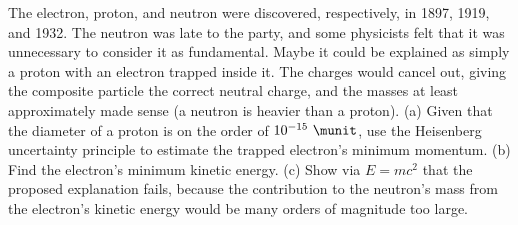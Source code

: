 The electron, proton, and neutron were discovered, respectively, in 1897, 1919, and 1932.
The neutron was late to the party, and 
some physicists felt that it was unnecessary to consider it as fundamental.
Maybe it could be explained
as simply a proton with an electron trapped inside it. The charges would cancel out,
giving the composite particle the correct neutral charge, and the masses at least
approximately made sense (a neutron is heavier than a proton). (a) Given that the
diameter of a proton is on the order of $10^{-15}\ \munit$, use the Heisenberg
uncertainty principle to estimate the trapped electron's minimum momentum.\answercheck\hwendpart
(b) Find the electron's minimum kinetic energy.\answercheck\hwendpart
(c) Show via $E=mc^2$ that the proposed explanation fails, because the
contribution to the neutron's mass from the electron's kinetic energy would be
many orders of magnitude too large.
